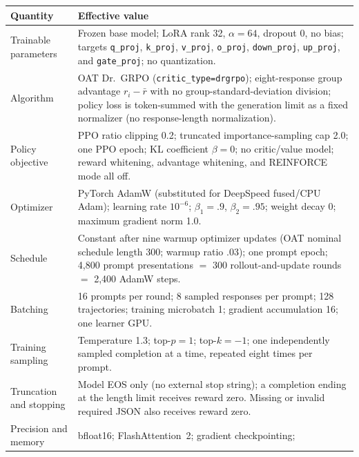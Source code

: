 \begin{center}
\begin{minipage}{\linewidth}
\centering
{}
\label{tab:exp3-oat-common}
\scriptsize
\setlength{\tabcolsep}{3pt}
\begin{tabular}{p{.29\linewidth}p{.66\linewidth}}
\toprule
\textbf{Quantity} & \textbf{Effective value} \\
\midrule
Trainable parameters & Frozen base model; LoRA rank 32, $\alpha=64$, dropout 0,
no bias; targets \texttt{q\_proj}, \texttt{k\_proj}, \texttt{v\_proj},
\texttt{o\_proj}, \texttt{down\_proj}, \texttt{up\_proj}, and
\texttt{gate\_proj}; no quantization. \\
Algorithm & OAT Dr.~GRPO (\texttt{critic\_type=drgrpo}); eight-response group
advantage $r_i-\bar r$ with no group-standard-deviation division; policy loss is
token-summed with the generation limit as a fixed normalizer (no response-length
normalization). \\
Policy objective & PPO ratio clipping 0.2; truncated importance-sampling cap 2.0;
one PPO epoch; KL coefficient $\beta=0$; no critic/value model; reward whitening,
advantage whitening, and REINFORCE mode all off. \\
Optimizer & PyTorch AdamW (substituted for DeepSpeed fused/CPU Adam); learning rate
$10^{-6}$; $\beta_1=.9$, $\beta_2=.95$; weight decay 0; maximum gradient norm 1.0. \\
Schedule & Constant after nine warmup optimizer updates (OAT nominal schedule
length 300; warmup ratio .03); one prompt epoch;
4,800 prompt presentations $=$ 300 rollout-and-update rounds $=$ 2,400 AdamW steps. \\
Batching & 16 prompts per round; 8 sampled responses per prompt; 128 trajectories;
training microbatch 1; gradient accumulation 16; one learner GPU. \\
Training sampling & Temperature 1.3; top-$p=1$; top-$k=-1$; one independently
sampled completion at a time, repeated eight times per prompt. \\
Truncation and stopping & Model EOS only (no external stop string); a completion
ending at the length limit receives reward zero.  Missing or invalid required JSON
also receives reward zero. \\
Precision and memory & bfloat16; FlashAttention~2; gradient checkpointing;

\end{tabular}
\end{minipage}
\end{center}
